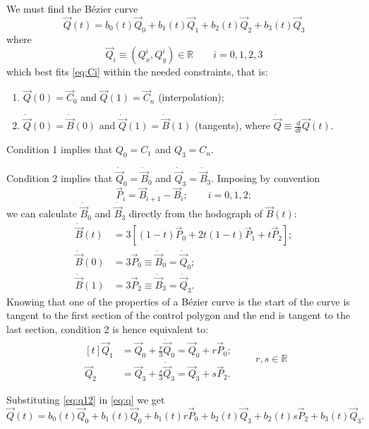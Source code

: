 \documentclass{scrartcl}
\newcommand\V[1]{\vec{#1}}
\newcommand\D[1]{\dot{#1}}
\newcommand\DV[1]{\D{\V{#1}}}
\begin{document}
We must find the Bézier curve
\begin{equation}\label{eq:q}
\V{Q}(t) = b_0(t) \V{Q}_0 + b_1(t) \V{Q}_1 + b_2(t) \V{Q}_2 + b_3(t) \V{Q}_3
\end{equation}
where
\begin{equation*}
\V{Q}_i \equiv ( Q^i_x, Q^i_y ) \in \mathbb{R} \qquad i = 0,1,2,3
\end{equation*}
which best fits \eqref{eq:Ci} within the needed constraints, that is:
\begin{enumerate}
\item $\V{Q}(0) = \V{C}_0$ and $\V{Q}(1) = \V{C}_n$ (interpolation);
\item $\DV{Q}(0) = \DV{B}(0)$ and $\DV{Q}(1) = \DV{B}(1)$ (tangents),
where $\DV{Q} \equiv \frac{d}{dt} \V{Q}(t)$.
\end{enumerate}

\medskip
Condition 1 implies that $Q_0 = C_1$ and $Q_3 = C_n$.

Condition 2 implies that $\DV{Q}_0 = \DV{B}_0$ and
$\DV{Q}_3 = \DV{B}_3$. Imposing by convention
\begin{equation}\label{eq:pi}
    \V{P}_i = \V{B}_{i+1} - \V{B}_i; \qquad i = 0, 1, 2;
\end{equation}
we can calculate $\DV{B}_0$ and $\DV{B}_3$ directly from the hodograph
of $\V{B}(t)$:
\begin{align*}
    \DV{B}(t) &= 3 \left[ (1-t) \V{P}_0 + 2t(1-t) \V{P}_1 + t \V{P}_2 \right]; \\
    \DV{B}(0) &= 3 \V{P}_0 \equiv \DV{B}_0 = \DV{Q}_0; \\
    \DV{B}(1) &= 3 \V{P}_2 \equiv \DV{B}_3 = \DV{Q}_3.
\end{align*}
Knowing that one of the properties of a Bézier curve is the start of the
curve is tangent to the first section of the control polygon and the end
is tangent to the last section, condition 2 is hence equivalent to:
\begin{equation}\label{eq:q12}
\begin{aligned}[t]
    \V{Q}_1 &= \V{Q}_0 + \frac{r}{3} \DV{Q}_0 = \V{Q}_0 + r \V{P}_0; \\
    \V{Q}_2 &= \V{Q}_3 + \frac{s}{3} \DV{Q}_3 = \V{Q}_3 + s \V{P}_2.
\end{aligned}
\qquad r, s \in \mathbb{R}
\end{equation}

Substituting \eqref{eq:q12} in \eqref{eq:q} we get
\begin{equation*}
\V{Q}(t) = b_0(t) \V{Q}_0 + b_1(t) \V{Q}_0 + b_1(t) r \V{P}_0 +
b_2(t) \V{Q}_3 + b_2(t) s \V{P}_2 + b_3(t) \V{Q}_3.
\end{equation*}
\end{document}
